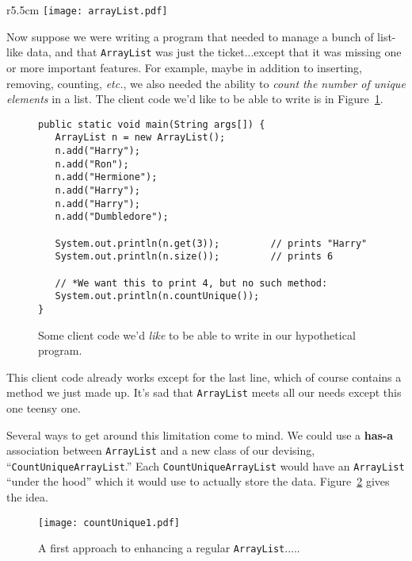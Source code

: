 \begin{wrapfigure}{r}{5.5cm}
\vspace{-.2in}
\texttt{[image: arrayList.pdf]}
\caption{An abbreviated \texttt{ArrayList} class.}
\label{fig:abbrArrayList}
\end{wrapfigure}

Now suppose we were writing a program that needed to manage a bunch of
list-like data, and that \texttt{ArrayList} was just the ticket...except that
it was missing one or more important features. For example, maybe in addition
to inserting, removing, counting, \textit{etc.}, we also needed the ability to
\textit{count the number of unique elements} in a list. The client code we'd
like to be able to write is in Figure~\ref{fig:dreamCountUnique}.

\begin{figure}[ht]
\centering
\begin{Verbatim}[fontsize=\footnotesize,samepage=true,frame=single]
public static void main(String args[]) {
   ArrayList n = new ArrayList();
   n.add("Harry");
   n.add("Ron");
   n.add("Hermione");
   n.add("Harry");
   n.add("Harry");
   n.add("Dumbledore");
 
   System.out.println(n.get(3));         // prints "Harry"
   System.out.println(n.size());         // prints 6

   // *We want this to print 4, but no such method:
   System.out.println(n.countUnique());
}
\end{Verbatim}
\caption{Some client code we'd \textit{like} to be able to write in our
hypothetical program.}
\label{fig:dreamCountUnique}
\end{figure}

This client code already works except for the last line, which of course
contains a method we just made up. It's sad that \texttt{ArrayList} meets all
our needs except this one teensy one.

Several ways to get around this limitation come to mind. We could use a
\textbf{has-a} association between \texttt{ArrayList} and a new class of our
devising, ``\texttt{CountUniqueArrayList}.'' Each \texttt{CountUniqueArrayList}
would have an \texttt{ArrayList} ``under the hood'' which it would use to
actually store the data. Figure~\ref{fig:countUnique1} gives the idea.

\begin{figure}
\centering
\texttt{[image: countUnique1.pdf]}  %
\caption{A first approach to enhancing a regular \texttt{ArrayList}.....}
\label{fig:countUnique1}
\end{figure}

